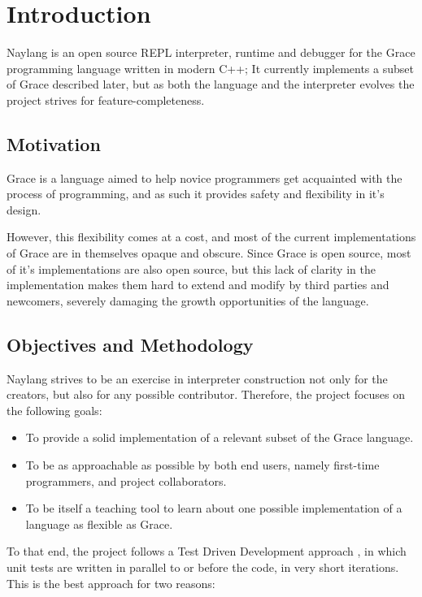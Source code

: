 \chapter{Introduction}\label{introduction}

Naylang is an open source REPL interpreter, runtime and debugger for the
Grace programming language written in modern C++; It currently
implements a subset of Grace described later, but as both the language
and the interpreter evolves the project strives for
feature-completeness.

\section{Motivation}\label{motivation}

Grace is a language aimed to help novice programmers get acquainted with
the process of programming, and as such it provides safety and
flexibility in it's design.

However, this flexibility comes at a cost, and most of the current
implementations of Grace are in themselves opaque and obscure. Since
Grace is open source, most of it's implementations are also open source,
but this lack of clarity in the implementation makes them hard to extend
and modify by third parties and newcomers, severely damaging the growth
opportunities of the language.

\section{Objectives and Methodology}\label{objectives-and-methodology}

Naylang strives to be an exercise in interpreter construction not only
for the creators, but also for any possible contributor. Therefore, the
project focuses on the following goals:

\begin{itemize}
\tightlist
\item
  To provide a solid implementation of a relevant subset of the Grace
  language.
\item
  To be as approachable as possible by both end users, namely first-time
  programmers, and project collaborators.
\item
  To be itself a teaching tool to learn about one possible
  implementation of a language as flexible as Grace.
\end{itemize}

To that end, the project follows a Test Driven Development approach
\cite{needed}, in which unit tests are written in parallel to or before
the code, in very short iterations. This is the best approach for two
reasons:

